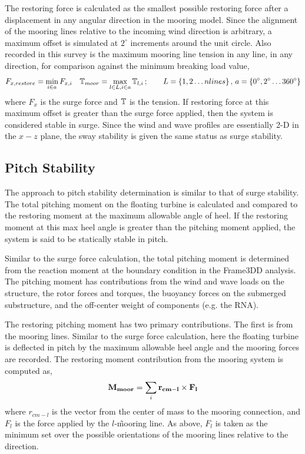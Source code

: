 The restoring force is calculated as the smallest possible restoring
force after a displacement in any angular direction in the mooring
model.  Since the alignment of the mooring lines relative to the
incoming wind direction is arbitrary, a maximum offset is simulated at
$2^{\circ}$ increments around the unit circle. Also recorded in this
survey is the maximum mooring line tension in any
line, in any direction, for comparison against the minimum breaking load
value,
\begin{equation}
  F_{x,restore} = \min_{i\in a} F_{x,i}\quad \mathbb{T}_{moor} = \max_{l\in L,i\in a} \mathbb{T}_{l,i}\,;
\qquad L=\left\{1,2\ldots nlines\right\}, \, a= \left\{0^{\circ}, 2^{\circ}\ldots 360^{\circ}\right\}
\end{equation}
where $F_x$ is the surge force and $\mathbb{T}$ is the tension.  If
restoring force at this maximum offset is greater than the surge force
applied, then the system is considered stable in surge.  Since the wind
and wave profiles are essentially 2-D in the $x-z$ plane, the sway
stability is given the same status as surge stability.


\subsection{Pitch Stability}
The approach to pitch stability determination is similar to that of
surge stability.  The total pitching moment on the floating turbine is
calculated and compared to the restoring moment at the maximum allowable
angle of heel.  If the restoring moment at this max heel angle is
greater than the pitching moment applied, the system is said to be
statically stable in pitch.

Similar to the surge force calculation, the total pitching moment is
determined from the reaction moment at the boundary condition
in the Frame3DD analysis.  The pitching moment has contributions from
the wind and wave loads on the structure, the rotor forces and torques,
the buoyancy forces on the submerged substructure, and the off-center
weight of components (e.g. the RNA).

The restoring pitching moment has two primary contributions.  The first
is from the mooring lines.  Similar to the surge force calculation, here
the floating turbine is deflected in pitch by the maximum allowable heel
angle and the mooring forces are recorded.  The restoring moment
contribution from the mooring system is computed as,
\begin{equation}
  \mathbf{M_{moor}} = \sum_i \mathbf{r_{cm-l}} \times \mathbf{F_l}
\end{equation}
where $r_{cm-l}$ is the vector from the center of mass to the mooring
connection, and $F_l$ is the force applied by the $l$-\th\~mooring
line.  As above, $F_l$ is taken as the minimum set over the possible
orientations of the mooring lines relative to the direction.

